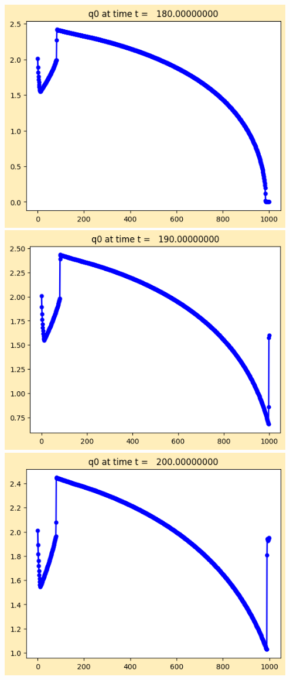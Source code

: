 \documentclass[11pt]{article}
\begin{document}
\vskip 10pt 
\includegraphics[width=0.95\textwidth]{frame0018fig1.png}
\vskip 10pt 
\includegraphics[width=0.95\textwidth]{frame0019fig1.png}
\vskip 10pt 
\includegraphics[width=0.95\textwidth]{frame0020fig1.png}
\end{document}
